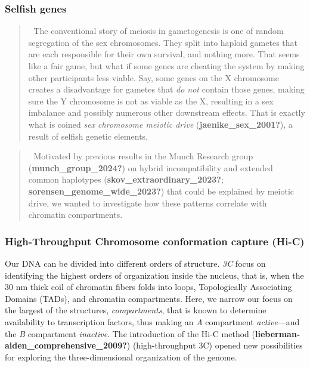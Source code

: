 \documentclass[
  a4paper,
  DIV=11,
  numbers=noendperiod]{scrarticle}
\begin{document}
\subsubsection{Selfish genes}\label{selfish-genes}

\begin{quote}
{📝} The conventional story of meiosis in gametogenesis is one of random
segregation of the sex chromosomes. They split into haploid gametes that
are each responsible for their own survival, and nothing more. That
seems like a fair game, but what if some genes are cheating the system
by making other participants less viable. Say, some genes on the X
chromosome creates a disadvantage for gametes that \emph{do not} contain
those genes, making sure the Y chromosome is not as viable as the X,
resulting in a sex imbalance and possibly numerous other downstream
effects. That is exactly what is coined \emph{sex chromosome meiotic
drive} (\textbf{jaenike\_sex\_2001?}), a result of selfish genetic
elements.
\end{quote}

\begin{quote}
{📝} Motivated by previous results in the Munch Research group
(\textbf{munch\_group\_2024?}) on hybrid incompatibility and extended
common haplotypes (\textbf{skov\_extraordinary\_2023?};
\textbf{sorensen\_genome\_wide\_2023?}) that could be explained by
meiotic drive, we wanted to investigate how these patterns correlate
with chromatin compartments.
\end{quote}

\subsubsection{High-Throughput Chromosome conformation capture
(Hi-C)}\label{high-throughput-chromosome-conformation-capture-hi-c}

Our DNA can be divided into different orders of structure. \emph{3C}
focus on identifying the highest orders of organization inside the
nucleus, that is, when the 30 nm thick coil of chromatin fibers folds
into loops, Topologically Associating Domains (TADs), and chromatin
compartments. Here, we narrow our focus on the largest of the
structures, \emph{compartments}, that is known to determine availability
to transcription factors, thus making an \emph{A} compartment
\emph{active}---and the \emph{B} compartment \emph{inactive}. The
introduction of the Hi-C method
(\textbf{lieberman-aiden\_comprehensive\_2009?}) (high-throughput 3C)
opened new possibilities for exploring the three-dimensional
organization of the genome.
\end{document}
